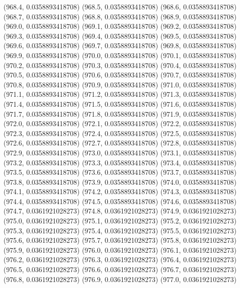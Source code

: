 {					(968.4, 0.0358893418708)
					(968.5, 0.0358893418708)
					(968.6, 0.0358893418708)
					(968.7, 0.0358893418708)
					(968.8, 0.0358893418708)
					(968.9, 0.0358893418708)
					(969.0, 0.0358893418708)
					(969.1, 0.0358893418708)
					(969.2, 0.0358893418708)
					(969.3, 0.0358893418708)
					(969.4, 0.0358893418708)
					(969.5, 0.0358893418708)
					(969.6, 0.0358893418708)
					(969.7, 0.0358893418708)
					(969.8, 0.0358893418708)
					(969.9, 0.0358893418708)
					(970.0, 0.0358893418708)
					(970.1, 0.0358893418708)
					(970.2, 0.0358893418708)
					(970.3, 0.0358893418708)
					(970.4, 0.0358893418708)
					(970.5, 0.0358893418708)
					(970.6, 0.0358893418708)
					(970.7, 0.0358893418708)
					(970.8, 0.0358893418708)
					(970.9, 0.0358893418708)
					(971.0, 0.0358893418708)
					(971.1, 0.0358893418708)
					(971.2, 0.0358893418708)
					(971.3, 0.0358893418708)
					(971.4, 0.0358893418708)
					(971.5, 0.0358893418708)
					(971.6, 0.0358893418708)
					(971.7, 0.0358893418708)
					(971.8, 0.0358893418708)
					(971.9, 0.0358893418708)
					(972.0, 0.0358893418708)
					(972.1, 0.0358893418708)
					(972.2, 0.0358893418708)
					(972.3, 0.0358893418708)
					(972.4, 0.0358893418708)
					(972.5, 0.0358893418708)
					(972.6, 0.0358893418708)
					(972.7, 0.0358893418708)
					(972.8, 0.0358893418708)
					(972.9, 0.0358893418708)
					(973.0, 0.0358893418708)
					(973.1, 0.0358893418708)
					(973.2, 0.0358893418708)
					(973.3, 0.0358893418708)
					(973.4, 0.0358893418708)
					(973.5, 0.0358893418708)
					(973.6, 0.0358893418708)
					(973.7, 0.0358893418708)
					(973.8, 0.0358893418708)
					(973.9, 0.0358893418708)
					(974.0, 0.0358893418708)
					(974.1, 0.0358893418708)
					(974.2, 0.0358893418708)
					(974.3, 0.0358893418708)
					(974.4, 0.0358893418708)
					(974.5, 0.0358893418708)
					(974.6, 0.0358893418708)
					(974.7, 0.0361921028273)
					(974.8, 0.0361921028273)
					(974.9, 0.0361921028273)
					(975.0, 0.0361921028273)
					(975.1, 0.0361921028273)
					(975.2, 0.0361921028273)
					(975.3, 0.0361921028273)
					(975.4, 0.0361921028273)
					(975.5, 0.0361921028273)
					(975.6, 0.0361921028273)
					(975.7, 0.0361921028273)
					(975.8, 0.0361921028273)
					(975.9, 0.0361921028273)
					(976.0, 0.0361921028273)
					(976.1, 0.0361921028273)
					(976.2, 0.0361921028273)
					(976.3, 0.0361921028273)
					(976.4, 0.0361921028273)
					(976.5, 0.0361921028273)
					(976.6, 0.0361921028273)
					(976.7, 0.0361921028273)
					(976.8, 0.0361921028273)
					(976.9, 0.0361921028273)
					(977.0, 0.0361921028273)
}
